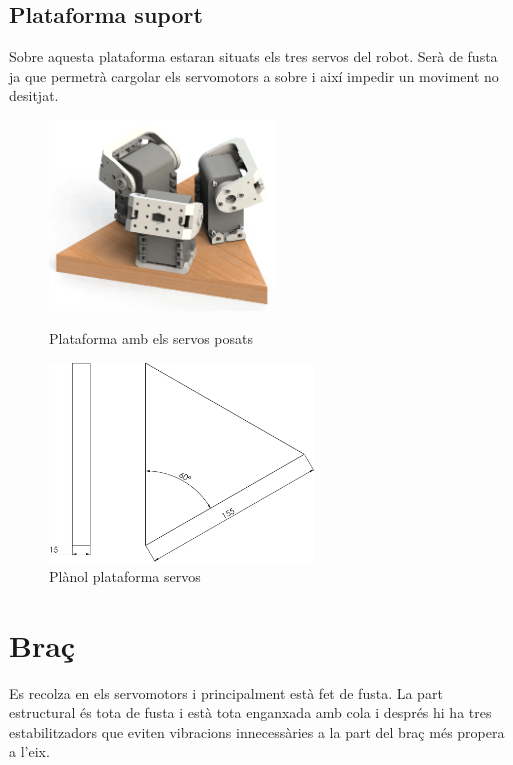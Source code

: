 \documentclass[a4paper, 12pt]{article}
\begin{document}
\subsection{Plataforma suport}
Sobre aquesta plataforma estaran situats els tres servos del robot. Serà de fusta ja que permetrà cargolar els servomotors a sobre i així impedir un moviment no desitjat.
\begin{figure}[h!]
\centering
\begin{minipage}[b]{0.45\linewidth}
\centering
\includegraphics[width=6cm]{./imgComp/plataforma}
\caption{Plataforma amb els servos posats}
\end{minipage}
\hfill
\begin{minipage}[b]{0.45\linewidth}
\centering
\includegraphics[width=7cm]{./sketch/plataforma}
\caption{Plànol plataforma servos}
\end{minipage}
\end{figure}


\newpage
\section{Braç}
Es recolza en els servomotors i principalment està fet de fusta. La part estructural és tota de fusta i està tota enganxada amb cola i després hi ha tres estabilitzadors que eviten vibracions innecessàries a la part del braç més propera a l'eix. 
\end{document}

